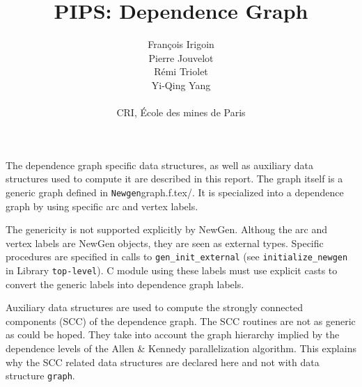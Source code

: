 

\title{PIPS: Dependence Graph}
\author{Fran\c{c}ois Irigoin \\
    Pierre Jouvelot \\
    R\'emi Triolet\\
    Yi-Qing Yang \\
\\
    CRI, \'Ecole des mines de Paris}

\newcommand{\domain}[2]{\paragraph{{#1}}\paragraph{}{#2}}


\maketitle


The dependence graph specific data structures, as well as auxiliary data
structures used to compute it are described in this report. The graph
itself is a generic graph defined in \verb/Newgen/graph.f.tex/. It is
specialized into a dependence graph by using specific arc and vertex
labels. 

The genericity is not supported explicitly by NewGen. Althoug the arc
and vertex labels are NewGen objects, they are seen as external
types. Specific procedures are specified in calls to
\verb/gen_init_external/ (see \verb/initialize_newgen/ in Library
\verb/top-level/). C module using these labels must use explicit
casts to convert the generic labels into dependence graph labels.

Auxiliary data structures are used to compute the strongly connected
components (SCC) of the dependence graph. The SCC routines are not as
generic as could be hoped. They take into account the graph hierarchy
implied by the dependence levels of the Allen \& Kennedy parallelization
algorithm. This explains why the SCC related data structures are
declared here and not with data structure \verb/graph/.

\iffalse
Les structures de donne'es suivantes sont utilise'es par la phase de
construction du graphe des de'pendances. Elles sont construites en
utilisant les structures de donne'es \verb+statement+ et \verb+effect+
qui ont e'te' de'finies dans la repre'sentation interne, ainsi que la
structure de donne'es ge'ne'riques \verb+vertex+ qui fait partie du
package {\em graph}.
\fi

